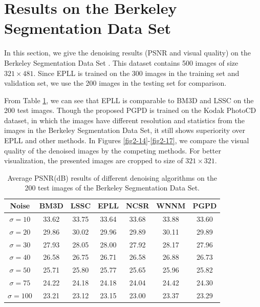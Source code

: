 \section{Results on the Berkeley Segmentation Data Set}
In this section, we give the denoising results (PSNR and visual quality) on the Berkeley Segmentation Data Set \cite{bsds}. This dataset contains 500 images of size $321\times481$. Since EPLL is trained on the 300 images in the training set and validation set, we use the 200 images in the testing set for comparison. 

From Table \ref{tab2-4}, we can see that EPLL is comparable to BM3D and LSSC on the 200 test images. Though the proposed PGPD is trained on the Kodak PhotoCD dataset, in which the images have different resolution and statistics from the images in the Berkeley Segmentation Data Set, it still shows superiority over EPLL and other methods. In Figures \ref{fig2-14}-\ref{fig2-17}, we compare the visual quality of the denoised images by the competing methods. For better visualization, the presented images are cropped to size of $321\times 321$.
\begin{table}
\caption{Average PSNR(dB) results of different denoising algorithms on the 200 test images of the Berkeley Segmentation Data Set.}
\label{tab2-4}
\begin{center}
\begin{tabular}{|c||c|c|c|c|c|c|}
\hline
Noise&\textbf{BM3D}&\textbf{LSSC}&\textbf{EPLL}&\textbf{NCSR}&\textbf{WNNM}&\textbf{PGPD}
\\
\hline
\hline
$\sigma=10$&33.62 &33.75&33.64 & 33.68& 33.88 &33.60
\\
\hline
$\sigma=20$& 29.86&30.02& 29.96 &29.89 & 30.11&  29.89 
\\
\hline
$\sigma=30$&27.93 &28.05 &28.00 &27.92 &28.17 &27.96  
\\
\hline
$\sigma=40$&26.58 &26.75&26.71 &26.58 & 26.88 & 26.73 
\\
\hline
$\sigma=50$&25.71 &25.80 &25.77 &25.65 &25.96  & 25.82 
\\
\hline
$\sigma=75$&24.22 &24.18 &24.18 & 24.04 &24.42  & 24.30
\\
\hline
$\sigma=100$&23.21 &23.12 & 23.15 & 23.00 & 23.37 & 23.29
\\
\hline
\end{tabular}
\end{center}
\end{table}


